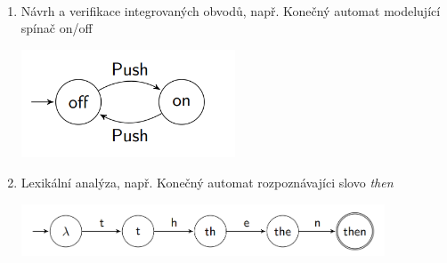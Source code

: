 \documentclass[../main.tex]{subfiles}
\begin{document}
\begin{example}
    $ $\\
    \begin{enumerate}
        \item Návrh a verifikace integrovaných obvodů, např.
        Konečný automat modelující spínač on/off

        \begin{center}
        \includegraphics[width=0.5\textwidth]{01-on_off.png}
        \end{center}
        
        \item Lexikální analýza, např.
        Konečný automat rozpoznávajíci slovo \textit{then}
        
        \begin{center}
        \includegraphics[width=0.85\textwidth]{01-then_search.png}
        \end{center}
    \end{enumerate}
\end{example}
\end{document}
